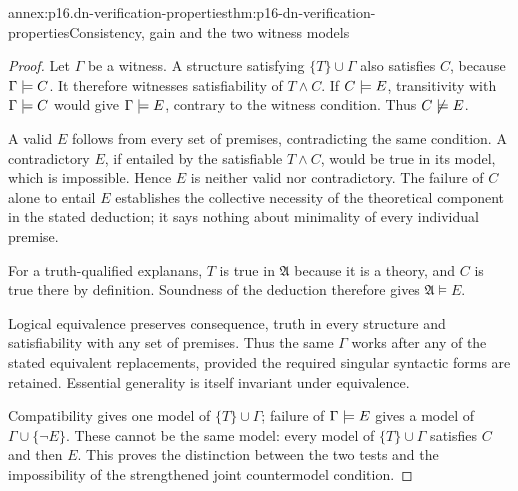 \begin{annexitem}{annex:p16.dn-verification-properties}{thm:p16-dn-verification-properties}{Consistency, gain and the two witness models}
\begin{proof}
Let \(\Gamma\) be a witness. A structure satisfying
\(\{T\}\cup\Gamma\) also satisfies \(C\), because
\(\Gamma\models C\). It therefore witnesses
satisfiability of \(T\land C\).
If \(C\models E\), transitivity with
\(\Gamma\models C\) would give
\(\Gamma\models E\), contrary to the witness
condition. Thus \(C\not\models E\).

A valid \(E\) follows from every set of
premises, contradicting the same condition.
A contradictory \(E\), if entailed by
the satisfiable \(T\land C\), would be
true in its model, which is impossible.
Hence \(E\) is neither valid nor contradictory.
The failure of \(C\) alone to entail \(E\)
establishes the collective necessity of
the theoretical component in the stated
deduction; it says nothing about minimality
of every individual premise.

For a truth-qualified explanans, \(T\)
is true in \(\mathfrak A\) because it
is a theory, and \(C\) is true there
by definition. Soundness of the deduction
therefore gives \(\mathfrak A\models E\).

Logical equivalence preserves consequence,
truth in every structure and satisfiability
with any set of premises. Thus the same
\(\Gamma\) works after any of the stated
equivalent replacements, provided the
required singular syntactic forms are
retained. Essential generality is itself
invariant under equivalence.

Compatibility gives one model of
\(\{T\}\cup\Gamma\); failure of
\(\Gamma\models E\) gives a model
of \(\Gamma\cup\{\neg E\}\).
These cannot be the same model:
every model of \(\{T\}\cup\Gamma\)
satisfies \(C\) and then \(E\).
This proves the distinction between
the two tests and the impossibility
of the strengthened joint countermodel
condition.
\end{proof}
\end{annexitem}

